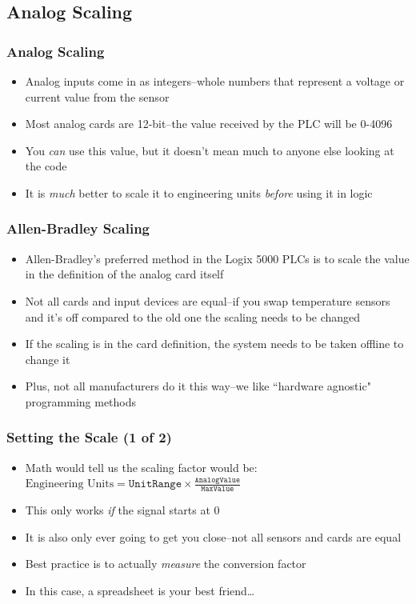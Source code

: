 \subsection{Analog Scaling}

\begin{frame}
    \frametitle{Analog Scaling}

    \begin{itemize}
        \item Analog inputs come in as integers--whole numbers that represent a voltage or current value from the sensor
        \item Most analog cards are 12-bit--the value received by the PLC will be 0-4096
        \item You \emph{can} use this value, but it doesn't mean much to anyone else looking at the code
        \item It is \emph{much} better to scale it to engineering units \emph{before} using it in logic
    \end{itemize}
\end{frame}

\begin{frame}
    \frametitle{Allen-Bradley Scaling}

    \begin{itemize}
        \item Allen-Bradley's preferred method in the Logix 5000 PLCs is to scale the value in the definition of the analog card itself
        \item Not all cards and input devices are equal--if you swap temperature sensors and it's off compared to the old one the scaling needs to be changed
        \item If the scaling is in the card definition, the system needs to be taken offline to change it
        \item Plus, not all manufacturers do it this way--we like ``hardware agnostic" programming methods
    \end{itemize}
\end{frame}

\begin{frame}
    \frametitle{Setting the Scale (1 of 2)}
    \begin{itemize}
        \item Math would tell us the scaling factor would be: $\text{Engineering Units} = \texttt{UnitRange} \times \frac{\texttt{AnalogValue}}{\texttt{MaxValue}}$
        \item This only works \emph{if} the signal starts at 0
        \item It is also only ever going to get you close--not all sensors and cards are equal
        \item Best practice is to actually \emph{measure} the conversion factor
        \item In this case, a spreadsheet is your best friend\dots
    \end{itemize}
\end{frame}


